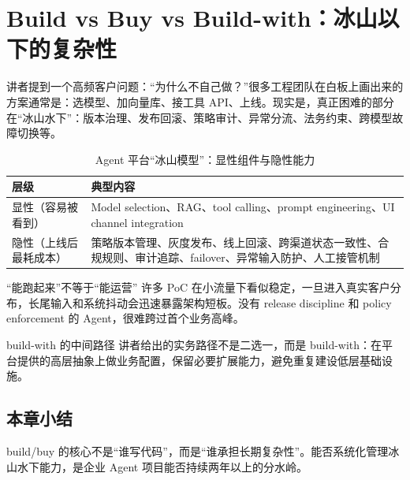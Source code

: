 \section{Build vs Buy vs Build-with：冰山以下的复杂性}

讲者提到一个高频客户问题：“为什么不自己做？”很多工程团队在白板上画出来的方案通常是：选模型、加向量库、接工具 API、上线。现实是，真正困难的部分在“冰山水下”：版本治理、发布回滚、策略审计、异常分流、法务约束、跨模型故障切换等。

\begin{table}[H]
\centering
\caption{Agent 平台“冰山模型”：显性组件与隐性能力}
\begin{tabularx}{\textwidth}{>{\raggedright\arraybackslash}p{3.4cm} >{\raggedright\arraybackslash}X}
\toprule
层级 & 典型内容 \\
\midrule
显性（容易被看到） & Model selection、RAG、tool calling、prompt engineering、UI channel integration \\
隐性（上线后最耗成本） & 策略版本管理、灰度发布、线上回滚、跨渠道状态一致性、合规规则、审计追踪、failover、异常输入防护、人工接管机制 \\
\bottomrule
\end{tabularx}
\end{table}

\begin{warningbox}{“能跑起来”不等于“能运营”}
许多 PoC 在小流量下看似稳定，一旦进入真实客户分布，长尾输入和系统抖动会迅速暴露架构短板。没有 release discipline 和 policy enforcement 的 Agent，很难跨过首个业务高峰。
\end{warningbox}

\begin{importantbox}{build-with 的中间路径}
讲者给出的实务路径不是二选一，而是 build-with：在平台提供的高层抽象上做业务配置，保留必要扩展能力，避免重复建设低层基础设施。
\end{importantbox}

\subsection{本章小结}

build/buy 的核心不是“谁写代码”，而是“谁承担长期复杂性”。能否系统化管理冰山水下能力，是企业 Agent 项目能否持续两年以上的分水岭。

